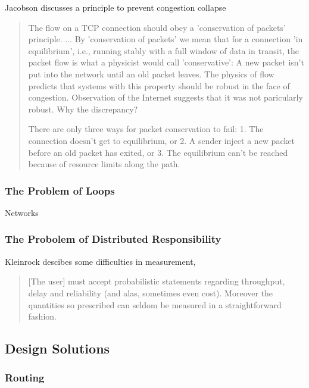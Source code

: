 Jacobson \cite{jacobson1988} discusses a principle to prevent congestion collapse

\begin{quote}
    The flow on a TCP connection should obey a 'conservation of packets' principle. ... By
    'conservation of packets' we mean that for a connection 'in equilibrium', i.e., running stably
    with a full window of data in transit, the packet flow is what a physicist would call
    'conservative': A new packet isn't put into the network until an old packet leaves. The physics
    of flow predicts that systems with this property should be robust in the face of congestion.
    Observation of the Internet suggests that it was not paricularly robust. Why the discrepancy?

    There are only three ways for packet conservation to fail:
    1. The connection doesn't get to equilibrium, or
    2. A sender inject a new packet before an old packet has exited, or
    3. The equilibrium can't be reached because of resource limits along the path.
\end{quote}

\subsubsection{The Problem of Loops} 

Networks

\subsubsection{The Probolem of Distributed Responsibility}

Kleinrock descibes some difficulties in measurement\cite{kleinrock1978},

\begin{quote}
    [The user] must accept probabilistic statements regarding throughput, delay and reliability (and
    alas, sometimes even cost). Moreover the quantities so prescribed can seldom be measured in a
    straightforward fashion.
\end{quote}

\subsection{Design Solutions}

\subsubsection{Routing}

